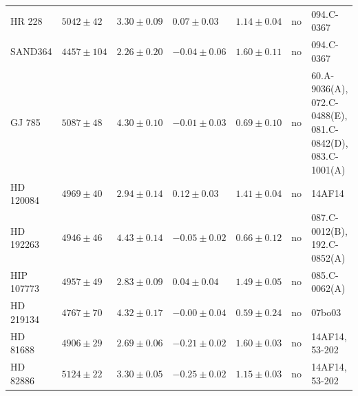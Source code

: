\documentclass{aa}
\begin{document}
\begin{table}[htb!]
\begin{tabular}{lllllll}
       HR 228     &  $5042 \pm  42$      &  $3.30 \pm 0.09$    &  $ 0.07 \pm 0.03$    &  $1.14 \pm 0.04$             &             no              &  094.C-0367                                                                                                              \\
      SAND364     &  $4457 \pm 104$      &  $2.26 \pm 0.20$    &  $-0.04 \pm 0.06$    &  $1.60 \pm 0.11$             &             no              &  094.C-0367                                                                                                              \\
       GJ 785     &  $5087 \pm  48$      &  $4.30 \pm 0.10$    &  $-0.01 \pm 0.03$    &  $0.69 \pm 0.10$             &             no              &  60.A-9036(A), 072.C-0488(E), 081.C-0842(D), 083.C-1001(A)                                                               \\
    HD 120084     &  $4969 \pm  40$      &  $2.94 \pm 0.14$    &  $ 0.12 \pm 0.03$    &  $1.41 \pm 0.04$             &             no              &  14AF14                                                                                                                  \\
    HD 192263     &  $4946 \pm  46$      &  $4.43 \pm 0.14$    &  $-0.05 \pm 0.02$    &  $0.66 \pm 0.12$             &             no              &  087.C-0012(B), 192.C-0852(A)                                                                                            \\
   HIP 107773     &  $4957 \pm  49$      &  $2.83 \pm 0.09$    &  $ 0.04 \pm 0.04$    &  $1.49 \pm 0.05$             &             no              &  085.C-0062(A)                                                                                                           \\
    HD 219134     &  $4767 \pm  70$      &  $4.32 \pm 0.17$    &  $-0.00 \pm 0.04$    &  $0.59 \pm 0.24$             &             no              &  07bo03                                                                                                                  \\
     HD 81688     &  $4906 \pm  29$      &  $2.69 \pm 0.06$    &  $-0.21 \pm 0.02$    &  $1.60 \pm 0.03$             &             no              &  14AF14, 53-202                                                                                                          \\
     HD 82886     &  $5124 \pm  22$      &  $3.30 \pm 0.05$    &  $-0.25 \pm 0.02$    &  $1.15 \pm 0.03$             &             no              &  14AF14, 53-202                                                                                                          \\

\end{tabular}
\end{table}
\end{document}
